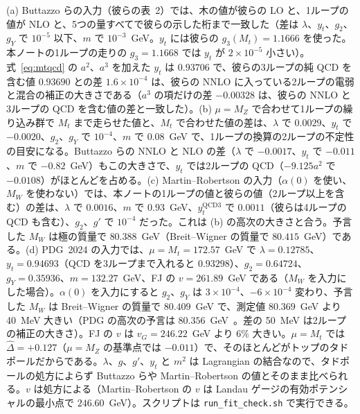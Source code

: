\documentclass[a4paper,10pt]{ltjsarticle}
\begin{document}
(a) Buttazzo らの入力（彼らの表~2）では、木の値が彼らの LO と、1ループの値が NLO と、5つの量すべてで彼らの示した桁まで一致した（差は $\lambda$、$y_t$、$g_2$、$g_Y$ で $10^{-5}$ 以下、$m$ で $10^{-3}$~GeV。$y_t$ には彼らの $g_3(M_t)=1.1666$ を使った。本ノートの1ループの走りの $g_3=1.1668$ では $y_t$ が $2\times10^{-5}$ 小さい）。式~\eqref{eq:mtqcd} の $a^2$、$a^3$ を加えた $y_t$ は $0.93706$ で、彼らの3ループの純 QCD を含む値 $0.93690$ との差 $1.6\times10^{-4}$ は、彼らの NNLO に入っている2ループの電弱と混合の補正の大きさである（$a^3$ の項だけの差 $-0.00328$ は、彼らの NNLO と3ループの QCD を含む値の差と一致した）。(b) $\mu=M_Z$ で合わせて1ループの繰り込み群で $M_t$ まで走らせた値と、$M_t$ で合わせた値の差は、$\lambda$ で $0.0029$、$y_t$ で $-0.0020$、$g_2$、$g_Y$ で $10^{-4}$、$m$ で $0.08$~GeV で、1ループの換算の2ループの不定性の目安になる。Buttazzo らの NNLO と NLO の差（$\lambda$ で $-0.0017$、$y_t$ で $-0.011$、$m$ で $-0.82$~GeV）もこの大きさで、$y_t$ では2ループの QCD（$-9.125a^2$ で $-0.0108$）がほとんどを占める。(c) Martin--Robertson の入力（$\alpha(0)$ を使い、$M_W$ を使わない）では、本ノートの1ループの値と彼らの値（2ループ以上を含む）の差は、$\lambda$ で $0.0016$、$m$ で $0.93$~GeV、$y_t^{\mathrm{QCD3}}$ で $0.0011$（彼らは4ループの QCD も含む）、$g_2$、$g'$ で $10^{-4}$ だった。これは (b) の高次の大きさと合う。予言した $M_W$ は極の質量で $80.388$~GeV（Breit--Wigner の質量で $80.415$~GeV）である。(d) PDG~2024 の入力では、$\mu=M_t=172.57$~GeV で $\lambda=0.12785$、$y_t=0.94693$（QCD を3ループまで入れると $0.93298$）、$g_2=0.64724$、$g_Y=0.35936$、$m=132.27$~GeV、FJ の $v=261.89$~GeV である（$M_W$ を入力にした場合）。$\alpha(0)$ を入力にすると $g_2$、$g_Y$ は $3\times10^{-4}$、$-6\times10^{-4}$ 変わり、予言した $M_W$ は Breit--Wigner の質量で $80.409$~GeV で、測定値 $80.369$~GeV より 40~MeV 大きい（PDG の高次の予言は $80.356$~GeV~\cite{pdg24}。差の 50~MeV は2ループの補正の大きさ）。FJ の $v$ は $v_G=246.22$~GeV より 6\% 大きい。$\mu=M_t$ では $\hat\Delta=+0.127$（$\mu=M_Z$ の基準点では $-0.011$）で、そのほとんどがトップのタドポールだからである。$\lambda$、$g$、$g'$、$y_t$ と $m^2$ は Lagrangian の結合なので、タドポールの処方によらず Buttazzo らや Martin--Robertson の値とそのまま比べられる。$v$ は処方による（Martin--Robertson の $v$ は Landau ゲージの有効ポテンシャルの最小点で $246.60$~GeV）。スクリプトは \texttt{run\_fit\_check.sh} で実行できる。
\end{document}
